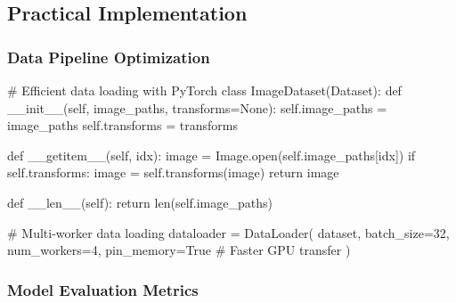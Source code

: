 \documentclass[
  11pt,
  letterpaper,
]{article}
\newenvironment{Shaded}{}{}
\newcommand{\BuiltInTok}[1]{\textcolor[rgb]{0.84,0.23,0.29}{#1}}
\newcommand{\CommentTok}[1]{\textcolor[rgb]{0.42,0.45,0.49}{#1}}
\newcommand{\ControlFlowTok}[1]{\textcolor[rgb]{0.84,0.23,0.29}{#1}}
\newcommand{\DecValTok}[1]{\textcolor[rgb]{0.00,0.36,0.77}{#1}}
\newcommand{\FunctionTok}[1]{\textcolor[rgb]{0.44,0.26,0.76}{#1}}
\newcommand{\KeywordTok}[1]{\textcolor[rgb]{0.84,0.23,0.29}{#1}}
\newcommand{\NormalTok}[1]{\textcolor[rgb]{0.14,0.16,0.18}{#1}}
\newcommand{\OperatorTok}[1]{\textcolor[rgb]{0.14,0.16,0.18}{#1}}
\newcommand{\VariableTok}[1]{\textcolor[rgb]{0.89,0.38,0.04}{#1}}
\begin{document}
\subsection{Practical Implementation}\label{practical-implementation}

\subsubsection{Data Pipeline
Optimization}\label{data-pipeline-optimization}

\begin{Shaded}
\begin{Highlighting}[]
\CommentTok{\# Efficient data loading with PyTorch}
\KeywordTok{class}\NormalTok{ ImageDataset(Dataset):}
    \KeywordTok{def} \FunctionTok{\_\_init\_\_}\NormalTok{(}\VariableTok{self}\NormalTok{, image\_paths, transforms}\OperatorTok{=}\VariableTok{None}\NormalTok{):}
        \VariableTok{self}\NormalTok{.image\_paths }\OperatorTok{=}\NormalTok{ image\_paths}
        \VariableTok{self}\NormalTok{.transforms }\OperatorTok{=}\NormalTok{ transforms}
        
    \KeywordTok{def} \FunctionTok{\_\_getitem\_\_}\NormalTok{(}\VariableTok{self}\NormalTok{, idx):}
\NormalTok{        image }\OperatorTok{=}\NormalTok{ Image.}\BuiltInTok{open}\NormalTok{(}\VariableTok{self}\NormalTok{.image\_paths[idx])}
        \ControlFlowTok{if} \VariableTok{self}\NormalTok{.transforms:}
\NormalTok{            image }\OperatorTok{=} \VariableTok{self}\NormalTok{.transforms(image)}
        \ControlFlowTok{return}\NormalTok{ image}
        
    \KeywordTok{def} \FunctionTok{\_\_len\_\_}\NormalTok{(}\VariableTok{self}\NormalTok{):}
        \ControlFlowTok{return} \BuiltInTok{len}\NormalTok{(}\VariableTok{self}\NormalTok{.image\_paths)}

\CommentTok{\# Multi{-}worker data loading}
\NormalTok{dataloader }\OperatorTok{=}\NormalTok{ DataLoader(}
\NormalTok{    dataset, }
\NormalTok{    batch\_size}\OperatorTok{=}\DecValTok{32}\NormalTok{, }
\NormalTok{    num\_workers}\OperatorTok{=}\DecValTok{4}\NormalTok{,}
\NormalTok{    pin\_memory}\OperatorTok{=}\VariableTok{True}  \CommentTok{\# Faster GPU transfer}
\NormalTok{)}
\end{Highlighting}
\end{Shaded}

\subsubsection{Model Evaluation Metrics}\label{model-evaluation-metrics}
\end{document}
